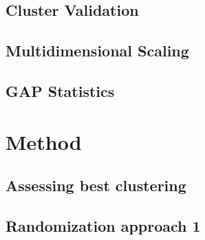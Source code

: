 \documentclass[a4paper,10pt]{article}
\begin{document}
\subsection{Cluster Validation}

\subsection{Multidimensional Scaling}

\subsection{GAP Statistics}

\newpage
\section{Method}

\subsection{Assessing best clustering}

\subsection{Randomization approach 1}
\end{document}
